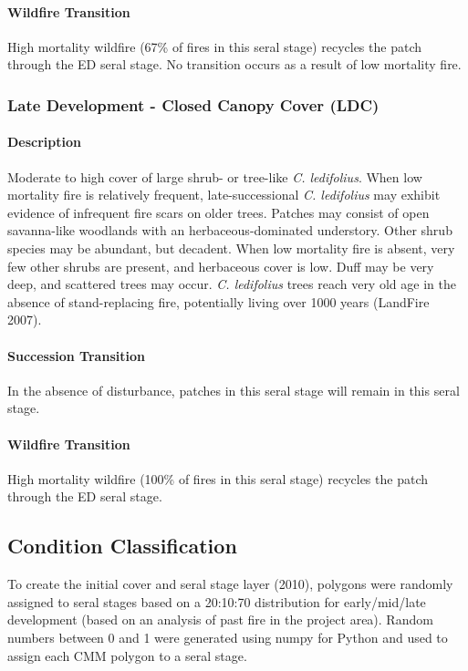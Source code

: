 \paragraph{Wildfire Transition} High mortality wildfire (67\% of fires in this seral stage) recycles the patch through the ED seral stage. No transition occurs as a result of low mortality fire.

\noindent\hrulefill


\subsubsection{Late Development - Closed Canopy Cover (LDC)}

\paragraph{Description} Moderate to high cover of large shrub- or tree-like \emph{C. ledifolius}. When low mortality fire is relatively frequent, late-successional \emph{C. ledifolius} may exhibit evidence of infrequent fire scars on older trees. Patches may consist of open savanna-like woodlands with an herbaceous-dominated understory. Other shrub species may be abundant, but decadent. When low mortality fire is absent, very few other shrubs are present, and herbaceous cover is low. Duff may be very deep, and scattered trees may occur. \emph{C. ledifolius} trees reach very old age in the absence of stand-replacing fire, potentially living over 1000 years (LandFire 2007).

\paragraph{Succession Transition} In the absence of disturbance, patches in this seral stage will remain in this seral stage. 

\paragraph{Wildfire Transition} High mortality wildfire (100\% of fires in this seral stage) recycles the patch through the ED seral stage.

\noindent\hrulefill

\subsection*{Condition Classification}
To create the initial cover and seral stage layer (2010), polygons were randomly assigned to seral stages based on a 20:10:70 distribution for early/mid/late development (based on an analysis of past fire in the project area). Random numbers between 0 and 1 were generated using numpy for Python and used to assign each CMM polygon to a seral stage.




